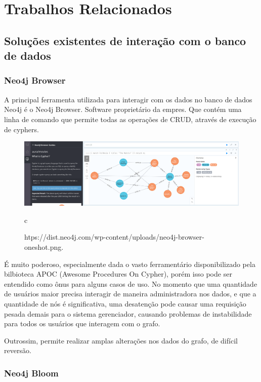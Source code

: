 \chapter{Trabalhos Relacionados}
\label{chap2}

\section{Soluções existentes de interação com o banco de dados}

\subsection{Neo4j Browser}
A principal ferramenta utilizada para interagir com os dados no banco de dados Neo4j é o Neo4j Browser. Software proprietário da empres. Que contém uma linha de comando que permite todas as operações de CRUD, através de execução de cyphers.


\begin{figure}[H]
    \centering
    \includegraphics[width=1.0\linewidth]{Imagens/chap02/neo4j-browser-oneshot.png}
    \caption{htps://dist.neo4j.com/wp-content/uploads/neo4j-browser-oneshot.png.}c
    \label{fig:profile-exemple}
\end{figure}

É muito poderoso, especialmente dada o vasto ferramentário disponibilizado pela bilbioteca APOC (Awesome Procedures On Cypher), porém isso pode ser entendido como ônus para alguns casos de uso. No momento que uma quantidade de usuários maior precisa interagir de maneira administradora nos dados, e que a quantidade de nós é significativa, uma desatenção pode causar uma requisição pesada demais para o sistema gerenciador, causando problemas de instabilidade para todos os usuários que interagem com o grafo.

Outrossim, permite realizar amplas alterações nos dados do grafo, de difícil reversão.

\subsection{Neo4j Bloom}

